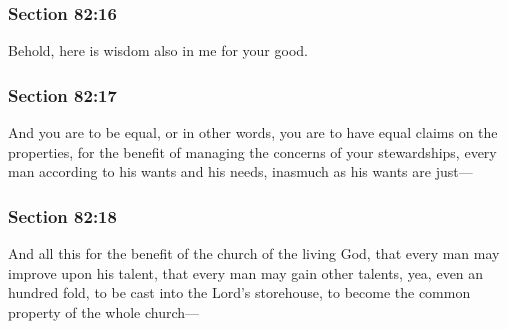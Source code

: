 	\subsubsection{Section 82:16} %
		\label{DC82-16}

		Behold, here is wisdom also in me for your good.


	\subsubsection{Section 82:17} %
		\label{DC82-17}

		And you are to be equal, or in other words, you are to have equal claims on the properties, for the benefit of managing the concerns of your stewardships, every man according to his wants and his needs, inasmuch as his wants are just—


	\subsubsection{Section 82:18} %
		\label{DC82-18}

		And all this for the benefit of the church of the living God, that every man may improve upon his talent, that every man may gain other talents, yea, even an hundred fold, to be cast into the Lord's storehouse, to become the common property of the whole church—


